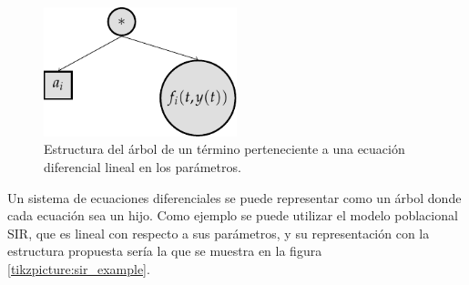 
\begin{figure}[h]
    \centering
    \includegraphics[width=0.5\textwidth]{"figures/doe_term_node_example.pdf"}
    \caption{Estructura del árbol de un término perteneciente a una ecuación diferencial lineal en los parámetros.}
    \label{tikzpicture:doe_term_node_example}
\end{figure}


Un sistema de ecuaciones diferenciales se puede representar como un árbol donde cada ecuación sea un hijo. Como ejemplo se puede utilizar el modelo poblacional SIR, que es lineal con respecto a sus parámetros, y su representación con la estructura propuesta sería la que se muestra en la figura \ref{tikzpicture:sir_example}.



